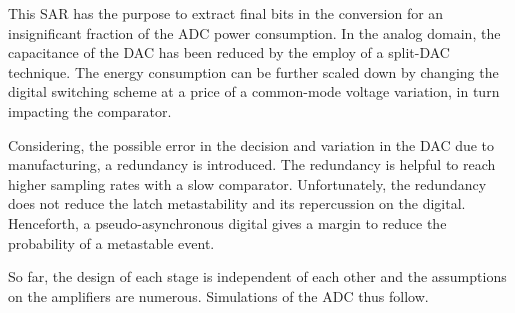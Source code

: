 This SAR has the purpose to extract final bits in the conversion for an insignificant fraction of the ADC power consumption. In the analog domain, the capacitance of the DAC has been reduced by the employ of a split-DAC technique. The energy consumption can be further scaled down by changing the digital switching scheme at a price of a common-mode voltage variation, in turn impacting the comparator.

Considering, the possible error in the decision and variation in the DAC due to manufacturing, a redundancy is introduced. The redundancy is helpful to reach higher sampling rates with a slow comparator. Unfortunately, the redundancy does not reduce the latch metastability and its repercussion on the digital. Henceforth, a pseudo-asynchronous digital gives a margin to reduce the probability of a metastable event.

So far, the design of each stage is independent of each other and the assumptions on the amplifiers are numerous. Simulations of the ADC thus follow.





